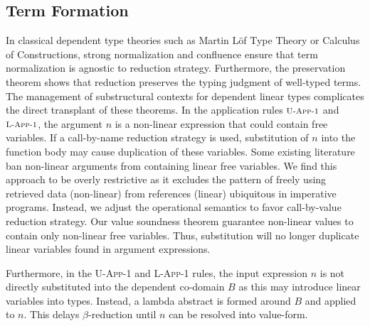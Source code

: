\documentclass{article}
\newcommand{\rname}[1]{\textsc{\footnotesize #1}}
\begin{document}
  \subsection{Term Formation}
  In classical dependent type theories such as Martin L\"{o}f Type Theory or Calculus of Constructions, strong normalization and confluence ensure that term normalization is agnostic to reduction strategy. Furthermore, the preservation theorem shows that reduction preserves the typing judgment of well-typed terms. The management of substructural contexts for dependent linear types complicates the direct transplant of these theorems. In the application rules $\rname{U-App-1}$ and $\rname{L-App-1}$, the argument $n$ is a non-linear expression that could contain free variables. If a call-by-name reduction strategy is used, substitution of $n$ into the function body may cause duplication of these variables. Some existing literature ban non-linear arguments from containing linear free variables. We find this approach to be overly restrictive as it excludes the pattern of freely using retrieved data (non-linear) from references (linear) ubiquitous in imperative programs. Instead, we adjust the operational semantics to favor call-by-value reduction strategy. Our value soundness theorem guarantee non-linear values to contain only non-linear free variables. Thus, substitution will no longer duplicate linear variables found in argument expressions.

  Furthermore, in the \rname{U-App-1} and \rname{L-App-1} rules, the input expression $n$ is not directly substituted into the dependent co-domain $B$ as this may introduce linear variables into types. Instead, a lambda abstract is formed around $B$ and applied to $n$. This delays $\beta$-reduction until $n$ can be resolved into value-form.
\end{document}
